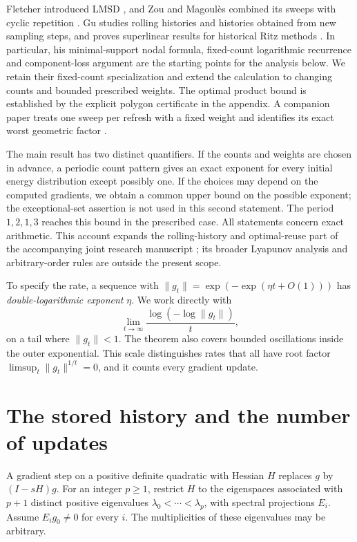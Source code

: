 \documentclass[11pt,a4paper]{article}
\numberwithin{equation}{section}
\begin{document}
Fletcher introduced LMSD \cite{Fletcher}, and Zou and
Magoul\`es combined its sweeps with cyclic repetition
\cite{Zou}. Gu studies rolling histories and histories obtained
from new sampling steps, and proves superlinear results for
historical Ritz methods \cite{Gu}. In particular, his
minimal-support nodal formula, fixed-count logarithmic recurrence
and component-loss argument are the starting points for the
analysis below. We retain their fixed-count specialization and
extend the calculation to changing counts and bounded prescribed
weights. The optimal product bound is established by the explicit
polygon certificate in the appendix. A companion paper treats one
sweep per refresh with a fixed weight and identifies its exact
worst geometric factor \cite{MinimalNote}.

The main result has two distinct quantifiers. If the counts and
weights are chosen in advance, a periodic count pattern gives an
exact exponent for every initial energy distribution except
possibly one. If the choices may depend on the computed gradients,
we obtain a common upper bound on the possible exponent; the
exceptional-set assertion is not used in this second statement.
The period \(1,2,1,3\) reaches this bound in the prescribed case.
All statements concern exact arithmetic. This account expands the
rolling-history and optimal-reuse part of the accompanying joint
research manuscript \cite{ArchiveB}; its broader Lyapunov analysis
and arbitrary-order rules are outside the present scope.

To specify the rate, a sequence with
\(\|g_t\|=\exp(-\exp(\eta t+O(1)))\) has
\emph{double-logarithmic exponent} \(\eta\). We work directly with
\[
 \lim_{t\to\infty}\frac{\log(-\log\|g_t\|)}{t},
\]
on a tail where \(\|g_t\|<1\). The theorem also covers bounded
oscillations inside the outer exponential. This scale distinguishes
rates that all have root factor
\(\limsup_t\|g_t\|^{1/t}=0\), and it counts every gradient update.

\section{The stored history and the number of updates}\label{sec:history}
A gradient step on a positive definite quadratic with Hessian \(H\) replaces \(g\) by \((I-sH)g\). For an integer \(p\ge1\), restrict \(H\) to the eigenspaces associated with \(p+1\) distinct positive eigenvalues \(\lambda_0<\cdots<\lambda_p\), with spectral projections \(E_i\). Assume \(E_i g_0\ne0\) for every \(i\). The multiplicities of these eigenvalues may be arbitrary.
\end{document}
